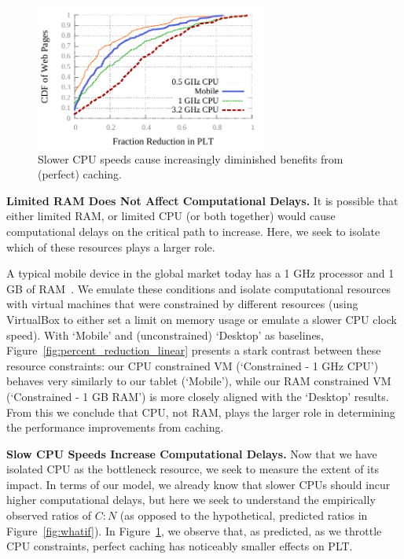 \begin{figure}[t]
    \includegraphics[width=3in]{../graphs/percent_plt_reduction/percent_reduction_linear_CPU_comparison.pdf}
    \caption[]{\label{fig:plt_cpu_comparison}Slower CPU speeds cause increasingly diminished benefits from (perfect) caching.}
\end{figure}
{\bf Limited RAM Does Not Affect Computational Delays.}
It is possible that either limited RAM, or limited CPU (or both together) would cause computational delays on the critical path to increase.
Here, we seek to isolate which of these resources plays a larger role.

A typical mobile device in the global market today has a 1 GHz processor and 1 GB of RAM~\cite{mobile-stats}. We emulate these conditions and isolate computational resources with virtual machines that were constrained by different resources (using VirtualBox to either set a limit on memory usage or emulate a slower CPU clock speed).
With `Mobile' and (unconstrained) `Desktop' as baselines, Figure~\ref{fig:percent_reduction_linear} presents a stark contrast between these resource constraints:
our CPU constrained VM (`Constrained - 1 GHz CPU') behaves very
similarly to our tablet (`Mobile'), while our RAM constrained VM (`Constrained - 1 GB RAM') is more closely aligned with the `Desktop' results.
From this we conclude that CPU, not RAM, plays the larger role in determining the performance improvements from caching.


{\bf Slow CPU Speeds Increase Computational Delays.}
Now that we have isolated CPU as the bottleneck resource, we seek to measure
the extent of its impact. In terms of our model, we already know that slower
CPUs should incur higher computational delays, but here we seek to understand
the empirically observed ratios of $C:N$ (as opposed to the hypothetical,
predicted ratios in Figure~\ref{fig:whatif}).
In Figure~\ref{fig:plt_cpu_comparison}, we observe that, as predicted,
as we throttle CPU constraints, perfect caching has noticeably smaller effects on PLT. %

